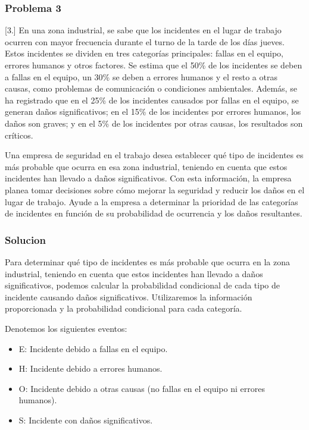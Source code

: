 \documentclass[
]{article}
\providecommand{\tightlist}{%
  \setlength{\itemsep}{0pt}\setlength{\parskip}{0pt}}
\begin{document}
\hypertarget{problema-3-1}{%
\subsubsection{Problema 3}\label{problema-3-1}}

{[}3.{]} En una zona industrial, se sabe que los incidentes en el lugar
de trabajo ocurren con mayor frecuencia durante el turno de la tarde de
los días jueves. Estos incidentes se dividen en tres categorías
principales: fallas en el equipo, errores humanos y otros factores. Se
estima que el 50\% de los incidentes se deben a fallas en el equipo, un
30\% se deben a errores humanos y el resto a otras causas, como
problemas de comunicación o condiciones ambientales. Además, se ha
registrado que en el 25\% de los incidentes causados por fallas en el
equipo, se generan daños significativos; en el 15\% de los incidentes
por errores humanos, los daños son graves; y en el 5\% de los incidentes
por otras causas, los resultados son críticos.

Una empresa de seguridad en el trabajo desea establecer qué tipo de
incidentes es más probable que ocurra en esa zona industrial, teniendo
en cuenta que estos incidentes han llevado a daños significativos. Con
esta información, la empresa planea tomar decisiones sobre cómo mejorar
la seguridad y reducir los daños en el lugar de trabajo. Ayude a la
empresa a determinar la prioridad de las categorías de incidentes en
función de su probabilidad de ocurrencia y los daños resultantes.

\hypertarget{solucion-5}{%
\subsubsection{\texorpdfstring{\textbf{Solucion}}{Solucion}}\label{solucion-5}}

Para determinar qué tipo de incidentes es más probable que ocurra en la
zona industrial, teniendo en cuenta que estos incidentes han llevado a
daños significativos, podemos calcular la probabilidad condicional de
cada tipo de incidente causando daños significativos. Utilizaremos la
información proporcionada y la probabilidad condicional para cada
categoría.

Denotemos los siguientes eventos:

\begin{itemize}
\tightlist
\item
  E: Incidente debido a fallas en el equipo.
\item
  H: Incidente debido a errores humanos.
\item
  O: Incidente debido a otras causas (no fallas en el equipo ni errores
  humanos).
\item
  S: Incidente con daños significativos.
\end{itemize}
\end{document}

